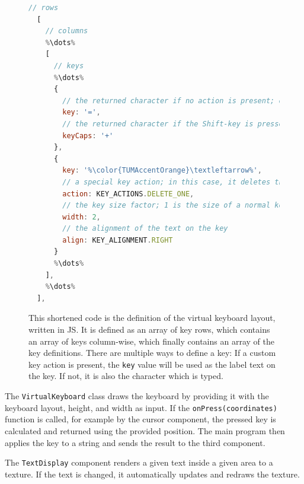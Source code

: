 \begin{figure}[H]
	\begin{lstlisting}[language=JavaScript]
  // rows
  [
    // columns
    %\dots%
    [ 
      // keys
      %\dots%
      {
        // the returned character if no action is present; otherwise just a label
        key: '=',
        // the returned character if the Shift-key is pressed
        keyCaps: '+'
      },
      {
        key: '%\color{TUMAccentOrange}\textleftarrow%',
        // a special key action; in this case, it deletes the last character
        action: KEY_ACTIONS.DELETE_ONE,
        // the key size factor; 1 is the size of a normal key
        width: 2, 
        // the alignment of the text on the key
        align: KEY_ALIGNMENT.RIGHT
      }
      %\dots%
    ],
    %\dots%
  ],
  \end{lstlisting}
	\caption[Virtual keyboard layout definition]{This shortened code is the definition of the virtual keyboard layout, written in \gls{JS}. It is defined as an array of key rows, which contains an array of keys column-wise, which finally contains an array of the key definitions. There are multiple ways to define a key: If a custom key action is present, the \lstinline{key} value will be used as the label text on the key. If not, it is also the character which is typed. }\label{fig:virtual-keyboard-layout}
\end{figure}

The \lstinline{VirtualKeyboard} class draws the keyboard by providing it with the keyboard layout, height, and width as input. If the \lstinline{onPress(coordinates)} function is called, for example by the cursor component, the pressed key is calculated and returned using the provided position. The main program then applies the key to a string and sends the result to the third component. %

The \lstinline{TextDisplay} component renders a given text inside a given area to a texture. If the text is changed, it automatically updates and redraws the texture.